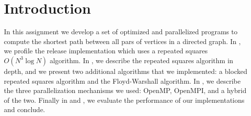 \section{Introduction}\label{sec:intro}
In this assignment we develop a set of optimized and parallelized programs to
compute the shortest path between all pars of vertices in a directed graph. In
, we profile the release implementation which uses a repeated
squares $O(N^3 \log N)$ algorithm. In , we describe the repeated
squares algorithm in depth, and we present two additional algorithms that we
implemented: a blocked repeated squares algorithm and the Floyd-Warshall
algorithm. In , we describe the three parallelization
mechanisms we used: OpenMP, OpenMPI, and a hybrid of the two. Finally in
 and , we evaluate the performance of our
implementations and conclude.
